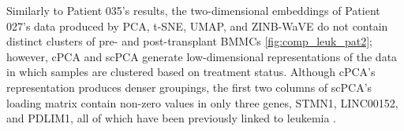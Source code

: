 Similarly to Patient 035's results, the two-dimensional embeddings of Patient 027's data produced by PCA, t-SNE, UMAP, and ZINB-WaVE do not contain distinct clusters of pre- and post-transplant BMMCs \ref{fig:comp_leuk_pat2}; however, cPCA and scPCA generate low-dimensional representations of the data in which samples are clustered based on treatment status. Although cPCA's representation produces denser groupings, the first two columns of scPCA's loading matrix contain non-zero values in only three genes, STMN1, LINC00152, and PDLIM1, all of which have been previously linked to leukemia \citep{Machado-Neto2014,Zhang2019,Holleman2004}. 